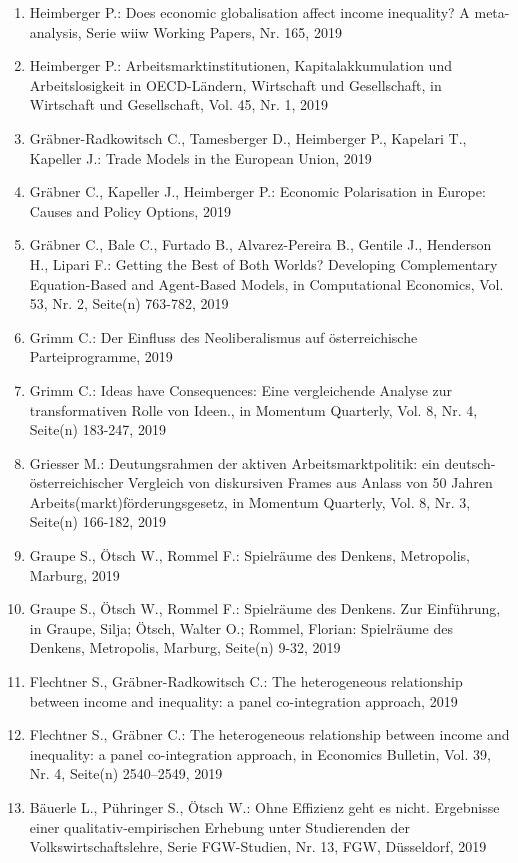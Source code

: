 \begin{enumerate}
	 \item Heimberger P.: Does economic globalisation affect income inequality? A meta-analysis, Serie wiiw Working Papers, Nr. 165, 2019
	 \item Heimberger P.: Arbeitsmarktinstitutionen, Kapitalakkumulation und Arbeitslosigkeit in OECD-Ländern, Wirtschaft und Gesellschaft, in Wirtschaft und Gesellschaft, Vol. 45, Nr. 1, 2019
	 \item Gräbner-Radkowitsch C., Tamesberger D., Heimberger P., Kapelari T., Kapeller J.: Trade Models in the European Union, 2019
	 \item Gräbner C., Kapeller J., Heimberger P.: Economic Polarisation in Europe: Causes and Policy Options, 2019
	 \item Gräbner C., Bale C., Furtado B., Alvarez-Pereira B., Gentile J., Henderson H., Lipari F.: Getting the Best of Both Worlds? Developing Complementary Equation-Based and Agent-Based Models, in Computational Economics, Vol. 53, Nr. 2, Seite(n) 763-782, 2019
	 \item Grimm C.: Der Einfluss des Neoliberalismus auf österreichische Parteiprogramme, 2019
	 \item Grimm C.: Ideas have Consequences: Eine vergleichende Analyse zur transformativen Rolle von Ideen., in Momentum Quarterly, Vol. 8, Nr. 4, Seite(n) 183-247, 2019
	 \item Griesser M.: Deutungsrahmen der aktiven Arbeitsmarktpolitik: ein deutsch-österreichischer Vergleich von diskursiven Frames aus Anlass von 50 Jahren Arbeits(markt)förderungsgesetz, in Momentum Quarterly, Vol. 8, Nr. 3, Seite(n) 166-182, 2019
	 \item Graupe S., Ötsch W., Rommel F.: Spielräume des Denkens, Metropolis, Marburg, 2019
	 \item Graupe S., Ötsch W., Rommel F.: Spielräume des Denkens. Zur Einführung, in Graupe, Silja; Ötsch, Walter O.; Rommel, Florian: Spielräume des Denkens, Metropolis, Marburg, Seite(n) 9-32, 2019
	 \item Flechtner S., Gräbner-Radkowitsch C.: The heterogeneous relationship between income and inequality: a panel co-integration approach, 2019
	 \item Flechtner S., Gräbner C.: The heterogeneous relationship between income and inequality: a panel co-integration approach, in Economics Bulletin, Vol. 39, Nr. 4, Seite(n) 2540–2549, 2019
	 \item Bäuerle L., Pühringer S., Ötsch W.: \glqq Ohne Effizienz geht es nicht\grqq{}. Ergebnisse einer qualitativ-empirischen Erhebung unter Studierenden der Volkswirtschaftslehre, Serie FGW-Studien, Nr. 13, FGW, Düsseldorf, 2019

\end{enumerate}
